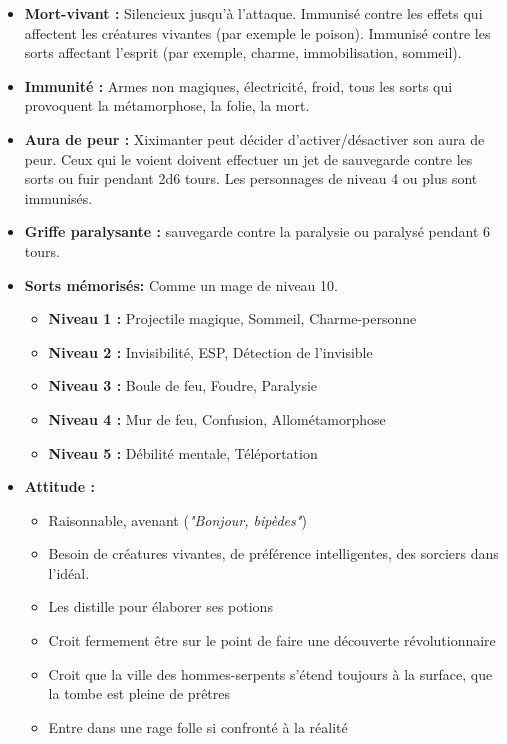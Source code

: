 \begin{itemize}
  \item \textbf{Mort-vivant :} Silencieux jusqu'à l'attaque.
  Immunisé contre les effets qui affectent les créatures vivantes (par exemple le poison).
  Immunisé contre les sorts affectant l'esprit (par exemple, charme, immobilisation, sommeil).
  \item \textbf{Immunité :} Armes non magiques, électricité, froid, tous les sorts qui provoquent la métamorphose, la folie, la mort.
  \item \textbf{Aura de peur :} Xiximanter peut décider d'activer/désactiver son aura de peur.
  Ceux qui le voient doivent effectuer un jet de sauvegarde contre les sorts ou fuir pendant 2d6 tours.
  Les personnages de niveau 4 ou plus sont immunisés.
  \item \textbf{Griffe paralysante :} sauvegarde contre la paralysie ou paralysé pendant 6 tours.
  \item \textbf{Sorts mémorisés:} Comme un mage de niveau 10.
  \begin{itemize}
    \item \textbf{Niveau 1 :} Projectile magique, Sommeil, Charme-personne
    \item \textbf{Niveau 2 :} Invisibilité, ESP, Détection de l'invisible
    \item \textbf{Niveau 3 :} Boule de feu, Foudre, Paralysie
    \item \textbf{Niveau 4 :} Mur de feu, Confusion, Allométamorphose
    \item \textbf{Niveau 5 :} Débilité mentale, Téléportation
  \end{itemize}
  \item \textbf{Attitude :}
  \begin{itemize}
    \item Raisonnable, avenant (\emph{"Bonjour, bipèdes"})
    \item Besoin de créatures vivantes, de préférence intelligentes, des sorciers dans l'idéal.
    \item Les distille pour élaborer ses potions
    \item Croit fermement être sur le point de faire une découverte révolutionnaire
    \item Croit que la ville des hommes-serpents s'étend toujours à la surface, que la tombe est pleine de prêtres
    \item Entre dans une rage folle si confronté à la réalité
  \end{itemize}
\end{itemize}